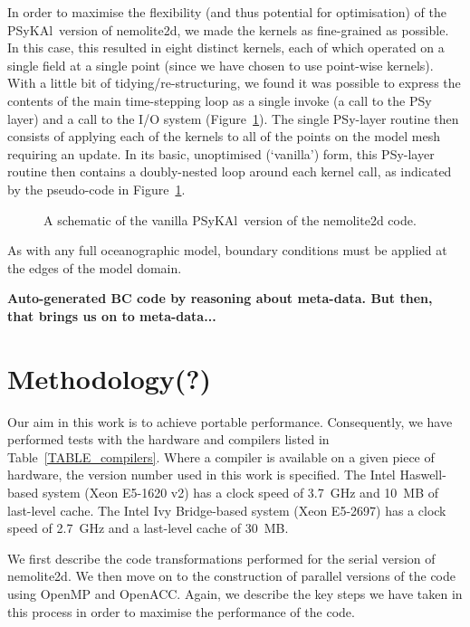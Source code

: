 \documentclass[journal]{IEEEtran}
\newcommand{\psykal}{{PS}y{KA}l\ }
\begin{document}
In order to maximise the flexibility (and thus potential for
optimisation) of the \psykal version of nemolite2d, we made the kernels
as fine-grained as possible. In this case, this resulted in eight
distinct kernels, each of which operated on a single field at a single
point (since we have chosen to use point-wise kernels). With a little
bit of tidying/re-structuring, we found it was possible to express the
contents of the main time-stepping loop as a single invoke (a call to
the PSy layer) and a call to the I/O system
(Figure~\ref{FIG_psykal_nemolite2d_structure}). The single PSy-layer
routine then consists of applying each of the kernels to all of the
points on the model mesh requiring an update. In its basic,
unoptimised (`vanilla') form, this PSy-layer routine then contains a
doubly-nested loop around each kernel call, as indicated by the
pseudo-code in Figure~\ref{FIG_psykal_nemolite2d_structure}.

\begin{figure}
\centering
\caption{A schematic of the vanilla \psykal version of the nemolite2d code.}
\label{FIG_psykal_nemolite2d_structure}
\end{figure}

As with any full oceanographic model, boundary conditions must be
applied at the edges of the model domain. 

{\bf Auto-generated BC code by reasoning about meta-data. But then,
  that brings us on to meta-data...}

\section{Methodology(?)}
\label{sec_methodology}

Our aim in this work is to achieve portable performance. Consequently,
we have performed tests with the hardware and compilers listed in
Table~\ref{TABLE_compilers}. Where a compiler is available on a given
piece of hardware, the version number used in this work is specified.
The Intel Haswell-based system (Xeon E5-1620 v2) has a clock speed of
3.7~GHz and 10~MB of last-level cache. The Intel Ivy Bridge-based
system (Xeon E5-2697) has a clock speed of 2.7~GHz and a last-level
cache of 30~MB. 

We first describe the code transformations performed for the serial
version of nemolite2d.  We then move on to the construction of
parallel versions of the code using OpenMP and OpenACC. Again, we
describe the key steps we have taken in this process in order to
maximise the performance of the code.
\end{document}
